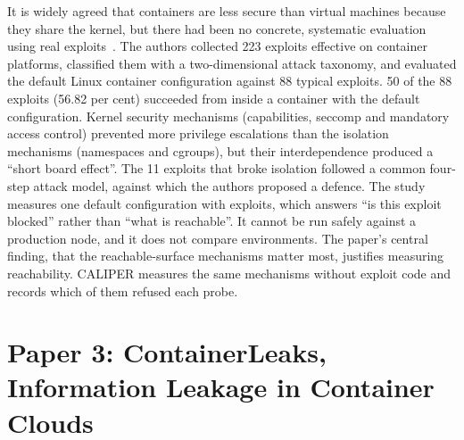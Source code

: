 It is widely agreed that containers are less secure than virtual machines because they share the kernel, but there had been no concrete, systematic evaluation using real exploits~\cite{lin2018}.
 The authors collected 223 exploits effective on container platforms, classified them with a two-dimensional attack taxonomy, and evaluated the default Linux container configuration against 88 typical exploits.
 50 of the 88 exploits (56.82 per cent) succeeded from inside a container with the default configuration. Kernel security mechanisms (capabilities, seccomp and mandatory access control) prevented more privilege escalations than the isolation mechanisms (namespaces and cgroups), but their interdependence produced a ``short board effect''. The 11 exploits that broke isolation followed a common four-step attack model, against which the authors proposed a defence.
 The study measures one default configuration with exploits, which answers ``is this exploit blocked'' rather than ``what is reachable''. It cannot be run safely against a production node, and it does not compare environments.
 The paper's central finding, that the reachable-surface mechanisms matter most, justifies measuring reachability. CALIPER measures the same mechanisms without exploit code and records which of them refused each probe.

\section{Paper 3: ContainerLeaks, Information Leakage in Container Clouds}
\label{lit:leaks}

